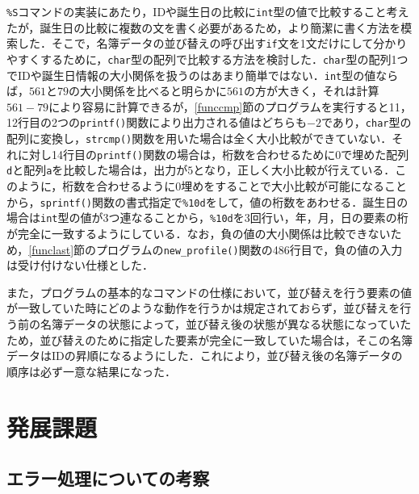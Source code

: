 \verb|%S|コマンドの実装にあたり，IDや誕生日の比較に\verb|int|型の値で比較すること考えたが，誕生日の比較に複数の文を書く必要があるため，より簡潔に書く方法を模索した．そこで，名簿データの並び替えの呼び出す\verb|if|文を1文だけにして分かりやすくするために，\verb|char|型の配列で比較する方法を検討した．\verb|char|型の配列1つでIDや誕生日情報の大小関係を扱うのはあまり簡単ではない．\verb|int|型の値ならば，$561$と$79$の大小関係を比べると明らかに$561$の方が大きく，それは計算$561 - 79$により容易に計算できるが，\ref{funccmp}節のプログラムを実行すると11，12行目の2つの\verb|printf()|関数により出力される値はどちらも$-2$であり，\verb|char|型の配列に変換し，\verb|strcmp()|関数を用いた場合は全く大小比較ができていない．それに対し14行目の\verb|printf()|関数の場合は，桁数を合わせるために0で埋めた配列\verb|d|と配列\verb|a|を比較した場合は，出力が$5$となり，正しく大小比較が行えている．このように，桁数を合わせるように0埋めをすることで大小比較が可能になることから，\verb|sprintf()|関数の書式指定で\verb|%10d|をして，値の桁数をあわせる．誕生日の場合は\verb|int|型の値が3つ連なることから，\verb|%10d|を3回行い，年，月，日の要素の桁が完全に一致するようにしている．なお，負の値の大小関係は比較できないため，\ref{funclast}節のプログラムの\verb|new_profile()|関数の486行目で，負の値の入力は受け付けない仕様とした．

また，プログラムの基本的なコマンドの仕様において，並び替えを行う要素の値が一致していた時にどのような動作を行うかは規定されておらず，並び替えを行う前の名簿データの状態によって，並び替え後の状態が異なる状態になっていたため，並び替えのために指定した要素が完全に一致していた場合は，そこの名簿データはIDの昇順になるようにした．これにより，並び替え後の名簿データの順序は必ず一意な結果になった．

\section{発展課題} \label{advancedfunction}

\subsection{エラー処理についての考察}

